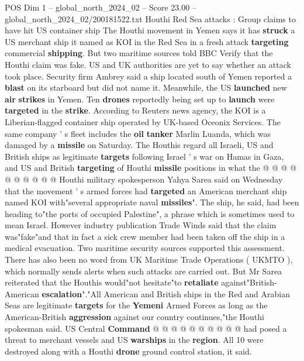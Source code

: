 \begin{textsample}{POS Dim 1 – global\_north\_2024\_02 – Score 23.00 – global\_north\_2024\_02/200181522.txt}  \label{ex:f1_pos_279}
Houthi Red Sea attacks : Group claims to have hit US container ship The Houthi movement in Yemen says it has \textbf{struck} a US merchant ship it named as KOI in the Red Sea in a fresh attack \textbf{targeting} commercial \textbf{shipping}.
But two maritime sources told BBC Verify that the Houthi claim was fake.
US and UK authorities are yet to say whether an attack took place.
Security firm Ambrey said a ship located south of Yemen reported a \textbf{blast} on its starboard but did not name it.
Meanwhile, the US \textbf{launched} new \textbf{air} \textbf{strikes} in Yemen.
Ten \textbf{drones} reportedly being set up to \textbf{launch} were \textbf{targeted} in the \textbf{strike}.
According to Reuters news agency, the KOI is a Liberian-flagged container ship operated by UK-based Oceonix Services.
The same company ' s fleet includes the \textbf{oil} \textbf{tanker} Marlin Luanda, which was damaged by a \textbf{missile} on Saturday.
The Houthis regard all Israeli, US and British ships as legitimate \textbf{targets} following Israel ' s war on Hamas in Gaza, and US and British \textbf{targeting} of Houthi \textbf{missile} positions in what the @ @ @ @ @ @ @ @ @ @ Houthi military spokesperson Yahya Sarea said on Wednesday that the movement ' s armed forces had \textbf{targeted} an American merchant ship named KOI with"several appropriate naval \textbf{missiles}".
The ship, he said, had been heading to"the ports of occupied Palestine", a phrase which is sometimes used to mean Israel.
However industry publication Trade Winds said that the claim was"fake"and that in fact a sick crew member had been taken off the ship in a medical evacuation.
Two maritime security sources supported this assessment.
There has also been no word from UK Maritime Trade Operations ( UKMTO ), which normally sends alerts when such attacks are carried out.
But Mr Sarea reiterated that the Houthis would"not hesitate"to \textbf{retaliate} against"British-American \textbf{escalation}"."All American and British ships in the Red and Arabian Seas are legitimate \textbf{targets} for the \textbf{Yemeni} Armed Forces as long as the American-British \textbf{aggression} against our country continues,"the Houthi spokesman said.
US Central \textbf{Command} @ @ @ @ @ @ @ @ @ @ had posed a threat to merchant vessels and US \textbf{warships} in the \textbf{region}.
All 10 were destroyed along with a Houthi \textbf{drone} ground control station, it said.

\end{textsample}
